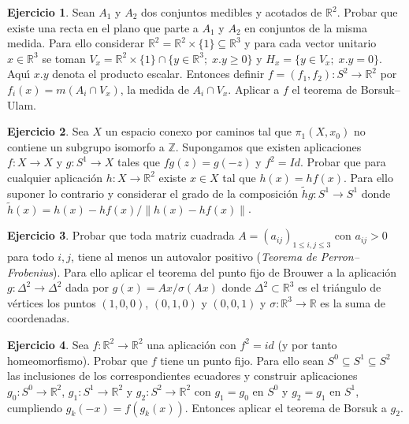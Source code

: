 \documentclass{article}
\theoremstyle{plain}
\theoremstyle{definition}
\newtheorem{exercise}{Ejercicio}
\newcommand{\R}{\mathbb{R}}
\begin{document}
\newpage

\begin{exercise}
Sean $A_1$ y $A_2$ dos conjuntos medibles y acotados de $\mathbb{R}^2$. Probar que existe una recta en el plano que parte a $A_1$ y $A_2$ en conjuntos de la misma medida. Para ello considerar $\mathbb{R}^2= \mathbb{R}^2\times
\{1\}\subseteq \mathbb{R}^3$  y para cada vector unitario $x\in \R^3$
se toman $V_x= \mathbb{R}^2\times \{1\} \cap \{y\in \R^3;\; x.y\ge 0\}$
y $H_x= \{y\in V_x;\; x.y = 0\}$. Aqu\'{\i} $x.y$ denota el producto escalar.
Entonces definir  $f = (f_1, f_2): S^2 \to \R^2$ por $f_i(x)= m(A_i\cap
V_x)$, la medida de  $A_i\cap V_x$. Aplicar a $f$ el teorema de Borsuk--Ulam.
\end{exercise}

\newpage

\begin{exercise}
Sea $X$ un espacio conexo por caminos tal que $\pi_1(X,x_0)$ no contiene un subgrupo isomorfo a $\mathbb{Z}$. Supongamos que existen aplicaciones
$f: X\to X$ y $g: S^1 \to X$ tales que
$fg(z) = g(-z)$ y $f^2=Id$. Probar que para cualquier aplicaci\'on  $h: X\to \mathbb{R}^2$ existe $x\in X$ tal que $h(x) = hf(x)$. Para ello suponer lo contrario y considerar  el grado de la composici\'on $\widetilde{h} g: S^1
\rightarrow S^1$ donde $\widetilde{h}(x) =
h(x)-hf(x)/\|h(x)-hf(x)\|$.
\end{exercise}

\newpage

\begin{exercise} Probar que toda matriz cuadrada
$A= (a_{ij})_{1\le i,j\le 3}$ con $a_{ij}> 0$ para todo $i,j$, tiene al menos un
autovalor positivo
(\emph{Teorema de Perron--Frobenius}). Para ello aplicar el teorema del punto fijo de
Brouwer a la aplicaci\'on $g: \Delta^2\to \Delta^2$ dada por $g(x)= Ax/\sigma(Ax)$ donde $\Delta^2\subset \R^3$ es el tri\'angulo de
v\'ertices los puntos $(1,0,0)$, $(0,1,0)$ y $(0,0,1)$ y  $\sigma: \R^3\to \R$ es la suma de coordenadas.
\end{exercise}

\newpage

\begin{exercise}
Sea $f:\R^2\to \R^2$ una aplicaci\'on con $f^2= id$ (y por tanto homeomorfismo). Probar que $f$ tiene un punto fijo. Para ello sean $S^0 \subseteq S^1 \subseteq S^2$ las inclusiones de los correspondientes ecuadores y construir aplicaciones $g_0: S^0 \to \R^2$, $g_1: S^1\to \mathbb{R}^2$ y $g_2: S^2\to \mathbb{R}^2$ con $g_1=g_0$ en $S^0$ y $g_2 = g_1$ en $S^1$, cumpliendo $g_k(-x) = f(g_k(x))$. Entonces aplicar el teorema de Borsuk a $g_2$.
\end{exercise}
\end{document}
